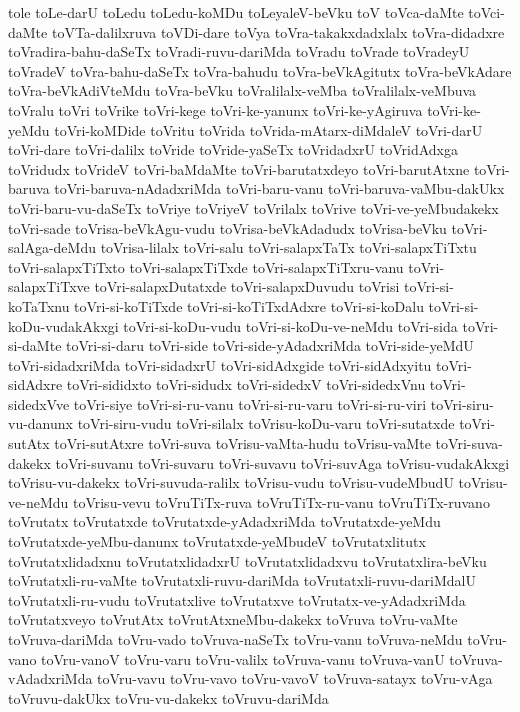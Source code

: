 {tole
toLe-darU
toLedu
toLedu-koMDu
toLeyaleV-beVku
toV
toVca-daMte
toVci-daMte
toVTa-dalilxruva
toVDi-dare
toVya
toVra-takakxdadxlalx
toVra-didadxre
toVradira-bahu-daSeTx
toVradi-ruvu-dariMda
toVradu
toVrade
toVradeyU
toVradeV
toVra-bahu-daSeTx
toVra-bahudu
toVra-beVkAgitutx
toVra-beVkAdare
toVra-beVkAdiVteMdu
toVra-beVku
toVralilalx-veMba
toVralilalx-veMbuva
toVralu
toVri
toVrike
toVri-kege
toVri-ke-yanunx
toVri-ke-yAgiruva
toVri-ke-yeMdu
toVri-koMDide
toVritu
toVrida
toVrida-mAtarx-diMdaleV
toVri-darU
toVri-dare
toVri-dalilx
toVride
toVride-yaSeTx
toVridadxrU
toVridAdxga
toVridudx
toVrideV
toVri-baMdaMte
toVri-barutatxdeyo
toVri-barutAtxne
toVri-baruva
toVri-baruva-nAdadxriMda
toVri-baru-vanu
toVri-baruva-vaMbu-dakUkx
toVri-baru-vu-daSeTx
toVriye
toVriyeV
toVrilalx
toVrive
toVri-ve-yeMbudakekx
toVri-sade
toVrisa-beVkAgu-vudu
toVrisa-beVkAdadudx
toVrisa-beVku
toVri-salAga-deMdu
toVrisa-lilalx
toVri-salu
toVri-salapxTaTx
toVri-salapxTiTxtu
toVri-salapxTiTxto
toVri-salapxTiTxde
toVri-salapxTiTxru-vanu
toVri-salapxTiTxve
toVri-salapxDutatxde
toVri-salapxDuvudu
toVrisi
toVri-si-koTaTxnu
toVri-si-koTiTxde
toVri-si-koTiTxdAdxre
toVri-si-koDalu
toVri-si-koDu-vudakAkxgi
toVri-si-koDu-vudu
toVri-si-koDu-ve-neMdu
toVri-sida
toVri-si-daMte
toVri-si-daru
toVri-side
toVri-side-yAdadxriMda
toVri-side-yeMdU
toVri-sidadxriMda
toVri-sidadxrU
toVri-sidAdxgide
toVri-sidAdxyitu
toVri-sidAdxre
toVri-sididxto
toVri-sidudx
toVri-sidedxV
toVri-sidedxVnu
toVri-sidedxVve
toVri-siye
toVri-si-ru-vanu
toVri-si-ru-varu
toVri-si-ru-viri
toVri-siru-vu-danunx
toVri-siru-vudu
toVri-silalx
toVrisu-koDu-varu
toVri-sutatxde
toVri-sutAtx
toVri-sutAtxre
toVri-suva
toVrisu-vaMta-hudu
toVrisu-vaMte
toVri-suva-dakekx
toVri-suvanu
toVri-suvaru
toVri-suvavu
toVri-suvAga
toVrisu-vudakAkxgi
toVrisu-vu-dakekx
toVri-suvuda-ralilx
toVrisu-vudu
toVrisu-vudeMbudU
toVrisu-ve-neMdu
toVrisu-vevu
toVruTiTx-ruva
toVruTiTx-ru-vanu
toVruTiTx-ruvano
toVrutatx
toVrutatxde
toVrutatxde-yAdadxriMda
toVrutatxde-yeMdu
toVrutatxde-yeMbu-danunx
toVrutatxde-yeMbudeV
toVrutatxlitutx
toVrutatxlidadxnu
toVrutatxlidadxrU
toVrutatxlidadxvu
toVrutatxlira-beVku
toVrutatxli-ru-vaMte
toVrutatxli-ruvu-dariMda
toVrutatxli-ruvu-dariMdalU
toVrutatxli-ru-vudu
toVrutatxlive
toVrutatxve
toVrutatx-ve-yAdadxriMda
toVrutatxveyo
toVrutAtx
toVrutAtxneMbu-dakekx
toVruva
toVru-vaMte
toVruva-dariMda
toVru-vado
toVruva-naSeTx
toVru-vanu
toVruva-neMdu
toVru-vano
toVru-vanoV
toVru-varu
toVru-valilx
toVruva-vanu
toVruva-vanU
toVruva-vAdadxriMda
toVru-vavu
toVru-vavo
toVru-vavoV
toVruva-satayx
toVru-vAga
toVruvu-dakUkx
toVru-vu-dakekx
toVruvu-dariMda
}
